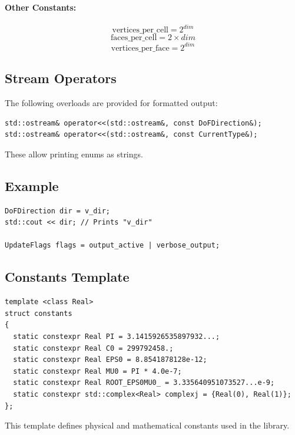 \documentclass{article}
\begin{document}
\paragraph{Other Constants:}
\[
\text{vertices\_per\_cell} = 2^{dim}
\]
\[
\text{faces\_per\_cell} = 2 \times dim
\]
\[
\text{vertices\_per\_face} = 2^{dim}
\]

\subsection{Stream Operators}
The following overloads are provided for formatted output:
\begin{verbatim}
std::ostream& operator<<(std::ostream&, const DoFDirection&);
std::ostream& operator<<(std::ostream&, const CurrentType&);
\end{verbatim}
These allow printing enums as strings.

\subsection{Example}
\begin{verbatim}
DoFDirection dir = v_dir;
std::cout << dir; // Prints "v_dir"

UpdateFlags flags = output_active | verbose_output;
\end{verbatim}
\subsection{Constants Template}

\begin{verbatim}
template <class Real>
struct constants
{
  static constexpr Real PI = 3.1415926535897932...;
  static constexpr Real C0 = 299792458.;
  static constexpr Real EPS0 = 8.8541878128e-12;
  static constexpr Real MU0 = PI * 4.0e-7;
  static constexpr Real ROOT_EPS0MU0_ = 3.335640951073527...e-9;
  static constexpr std::complex<Real> complexj = {Real(0), Real(1)};
};
\end{verbatim}

This template defines physical and mathematical constants used in the library.
\end{document}
